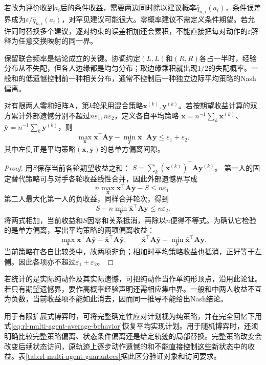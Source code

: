 若改为评价收到$a_i$后的条件收益，需要两边同时除以建议概率$\hat q_{n,i}(a_i)$，条件误差界成为$\varepsilon/\hat q_{n,i}(a_i)$，对罕见建议可能很大。零概率建议不需定义条件期望。若允许同时替换多个建议，逐对约束的误差相加还会累积，不能直接把每对动作的$\varepsilon$解释为任意交换映射的同一界。

保留联合频率是结论成立的关键。协调约定$(L,L)$和$(R,R)$各占一半时，经验分布从不失配，但各人边缘都是均匀分布；取边缘乘积就出现$1/2$的失配概率。一般和的低遗憾控制前一种相关分布，通常不控制后一种独立边际平均策略的Nash偏离。

\begin{theorem}[零和平均策略的鞍点间隙]
\label{thm:rl-multi-agent-average-gap}
对有限两人零和矩阵$\bm A$，第$k$轮采用混合策略$\bm x^{(k)},\bm y^{(k)}$。若按期望收益计算的双方累计外部遗憾分别不超过$n\varepsilon_1,n\varepsilon_2$，定义各自平均策略
$\bar{\bm x}=n^{-1}\sum_k\bm x^{(k)}$、
$\bar{\bm y}=n^{-1}\sum_k\bm y^{(k)}$，则
\[
 \max_{\bm x}\bm x^\top\bm A\bar{\bm y}
 -\min_{\bm y}\bar{\bm x}^\top\bm A\bm y
 \leq\varepsilon_1+\varepsilon_2.
\]
其中左侧正是平均策略$(\bar{\bm x},\bar{\bm y})$的总单方偏离间隙。
\end{theorem}
\begin{proof}
用$S$保存当前各轮期望收益之和：
$S=\sum_k(\bm x^{(k)})^\top\bm A\bm y^{(k)}$。
第一人的固定替代策略可与对手各轮收益线性合并，因此外部遗憾界写成
\[
 n\max_{\bm x}\bm x^\top\bm A\bar{\bm y}-S
 \leq n\varepsilon_1.
\]
第二人最大化第一人的负收益，同样合并轮次，得到
\[
 S-n\min_{\bm y}\bar{\bm x}^\top\bm A\bm y
 \leq n\varepsilon_2.
\]
将两式相加，当前收益和$S$因零和关系抵消，再除以$n$便得不等式。为确认它检验的是单方偏离，写出平均策略的两项偏离收益：
\[
 \max_{\bm x}\bm x^\top\bm A\bar{\bm y}
       -\bar{\bm x}^\top\bm A\bar{\bm y},
 \qquad
 \bar{\bm x}^\top\bm A\bar{\bm y}
       -\min_{\bm y}\bar{\bm x}^\top\bm A\bm y.
\]
当前策略在各自比较类中，故两项非负；相加时平均策略收益也抵消，正好等于左侧。因此各项亦不超过$\varepsilon_1+\varepsilon_2$。
\end{proof}

若统计的是实际纯动作及其实际遗憾，可把纯动作当作单纯形顶点，沿用此论证。若只有期望遗憾界，要作高概率经验声明还需相应集中界。一般和中两人收益不互为负数，当前收益项不能如此消去，因而同一推导不能给出Nash结论。

用于有限扩展式博弈时，可将完整确定性应对计划视为纯策略，并在完全回忆下用式\eqref{eq:rl-multi-agent-average-behavior}恢复平均实现计划。用于随机博弈时，还须明确比较完整策略偏离、状态条件偏离还是给定轨迹的局部替换。完整策略改变会改变后续状态访问，原轨迹上逐步动作遗憾的和不能直接控制这些新状态中的收益。表\ref{tab:rl-multi-agent-guarantees}据此区分验证对象和访问要求。

